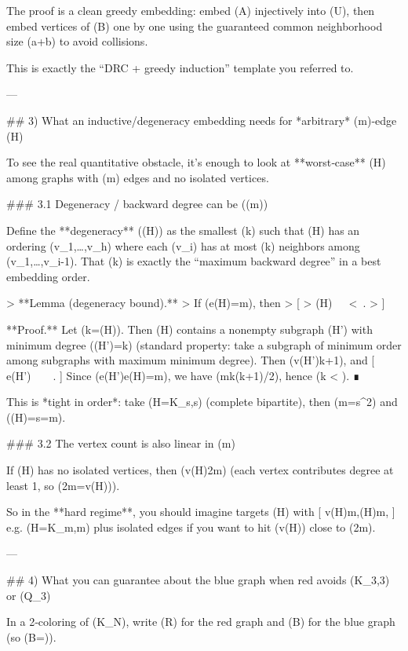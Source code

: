 The proof is a clean greedy embedding: embed (A) injectively into (U), then embed vertices of (B) one by one using the guaranteed common neighborhood size (a+b) to avoid collisions.

This is exactly the “DRC + greedy induction” template you referred to.

---

## 3) What an inductive/degeneracy embedding needs for *arbitrary* (m)-edge (H)

To see the real quantitative obstacle, it’s enough to look at **worst‑case** (H) among graphs with (m) edges and no isolated vertices.

### 3.1 Degeneracy / backward degree can be (\Theta(\sqrt m))

Define the **degeneracy** ((H)) as the smallest (k) such that (H) has an ordering (v_1,\dots,v_h) where each (v_i) has at most (k) neighbors among ({v_1,\dots,v_{i-1}}). That (k) is exactly the “maximum backward degree” in a best embedding order.

> **Lemma (degeneracy bound).**
> If (e(H)=m), then
> [
> (H)\ \le\ \left\lfloor{}\right\rfloor\ <\ .
> ]

**Proof.** Let (k=(H)). Then (H) contains a nonempty subgraph (H') with minimum degree (\delta(H')=k) (standard property: take a subgraph of minimum order among subgraphs with maximum minimum degree). Then (v(H')\ge k+1), and
[
e(H')\ \ge\ \ \ge\ .
]
Since (e(H')\le e(H)=m), we have (m\ge k(k+1)/2), hence (k < ). ∎

This is *tight in order*: take (H=K_{s,s}) (complete bipartite), then (m=s^2) and ((H)=s=\sqrt m).

### 3.2 The vertex count is also linear in (m)

If (H) has no isolated vertices, then (v(H)\le 2m) (each vertex contributes degree at least 1, so (2m=\sum \deg \ge v(H))).

So in the **hard regime**, you should imagine targets (H) with
[
v(H)\asymp m,\qquad {}(H)\asymp \sqrt m,
]
e.g. (H=K_{\lfloor\sqrt m\rfloor,\lfloor\sqrt m\rfloor}) plus isolated edges if you want to hit (v(H)) close to (2m).

---

## 4) What you can guarantee about the blue graph when red avoids (K_{3,3}) or (Q_3)

In a 2‑coloring of (K_N), write (R) for the red graph and (B) for the blue graph (so (B=)).

